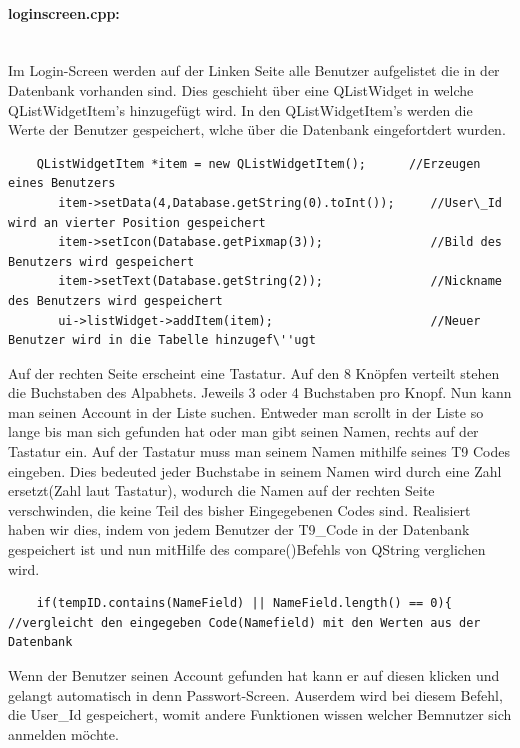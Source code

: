 \documentclass[11pt,a4paper]{article} %
\begin{document}
\paragraph{loginscreen.cpp:} $\;$ \\
	Im Login-Screen werden auf der Linken Seite alle Benutzer aufgelistet die in der Datenbank vorhanden sind. Dies geschieht über eine QListWidget in welche QListWidgetItem's hinzugefügt wird.
	In den QListWidgetItem's werden die Werte der Benutzer gespeichert, wlche über die Datenbank eingefortdert wurden. 
	\begin{frame}

\begin{lstlisting}
	QListWidgetItem *item = new QListWidgetItem();      //Erzeugen eines Benutzers
       item->setData(4,Database.getString(0).toInt());     //User\_Id wird an vierter Position gespeichert
       item->setIcon(Database.getPixmap(3));               //Bild des Benutzers wird gespeichert
       item->setText(Database.getString(2));               //Nickname des Benutzers wird gespeichert
       ui->listWidget->addItem(item);                      //Neuer Benutzer wird in die Tabelle hinzugef\''ugt
       \end{lstlisting}
\end{frame}
\par
	Auf der rechten Seite erscheint eine Tastatur. Auf den 8 Knöpfen verteilt stehen die Buchstaben des Alpabhets. Jeweils 3 oder 4 Buchstaben pro Knopf.
	Nun kann man seinen Account in der Liste suchen. Entweder man scrollt in der Liste so lange bis man sich gefunden hat oder man gibt seinen Namen, rechts auf der Tastatur ein.
	Auf der Tastatur muss man seinem Namen mithilfe seines T9 Codes eingeben. Dies bedeuted jeder Buchstabe in seinem Namen wird durch eine Zahl ersetzt(Zahl laut Tastatur), 
	wodurch die Namen auf der rechten Seite verschwinden, die keine Teil des bisher Eingegebenen Codes sind.
	Realisiert haben wir dies, indem von jedem Benutzer der T9\_Code in der Datenbank gespeichert ist und nun mitHilfe des compare()Befehls von QString verglichen wird.
	\begin{frame}

\begin{lstlisting}
	if(tempID.contains(NameField) || NameField.length() == 0){      //vergleicht den eingegeben Code(Namefield) mit den Werten aus der Datenbank  
	\end{lstlisting}
\end{frame}
\par	
	Wenn der Benutzer seinen Account gefunden hat kann er auf diesen klicken und gelangt automatisch in denn Passwort-Screen.
	Auserdem wird bei diesem Befehl, die User\_Id gespeichert, womit andere Funktionen wissen welcher Bemnutzer sich anmelden möchte.	
\par
\end{document}
